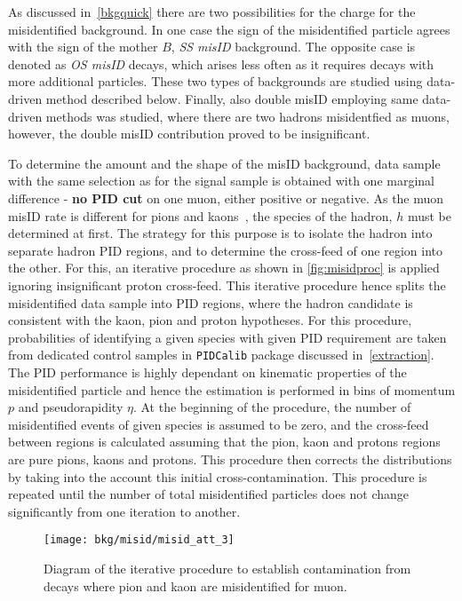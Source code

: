 As discussed in~\autoref{bkgquick} there are two possibilities for the charge for the misidentified background. In one case the sign of the misidentified particle agrees with the sign of the mother $B$, \textit{SS misID} background. The opposite case is denoted as \textit{OS misID} decays, which arises less often as it requires decays with more additional particles. These two types of backgrounds are studied using data-driven method described below. Finally, also double misID employing same data-driven methods was studied, where there are two hadrons misidentfied as muons, however, the double misID contribution proved to be insignificant.


To determine the amount and the shape of the misID background, data sample with the same selection as for the signal sample is obtained with one marginal difference - \textbf{no \gls{PID} cut} on one muon, either positive or negative. As the muon misID rate is different for pions and kaons~\cite{LHCb-DP-2013-001}, the species of the hadron, $h$ must be determined at first. The strategy for this purpose is to isolate the hadron into separate hadron \gls{PID} regions, and to determine the cross-feed of one region into the other. For this, an iterative procedure as shown in \autoref{fig:misidproc} is applied ignoring insignificant proton cross-feed. This iterative procedure hence splits the misidentified data sample into \gls{PID} regions, where the hadron candidate is consistent with the kaon, pion and proton hypotheses. For this procedure, probabilities of identifying a given species with given \gls{PID} requirement are taken from dedicated control samples in \texttt{PIDCalib} package \cite{Anderlini:2202412} discussed in~\autoref{extraction}. The \gls{PID} performance is highly dependant on kinematic properties of the misidentified particle and hence the estimation is performed in bins of momentum $p$ and pseudorapidity $\eta$.
At the beginning of the procedure, the number of misidentified events of given species is assumed to be zero, and the
cross-feed between regions is calculated assuming that the pion, kaon and protons regions are pure pions, kaons and protons.
This procedure then corrects the distributions by taking into the account this initial cross-contamination.
This procedure is repeated until the number of total misidentified particles does not change significantly from one iteration to another.

\begin{figure}[h]
  \begin{center}
    \texttt{[image: bkg/misid/misid\_att\_3]}%
    \vspace*{-0.5cm}
  \end{center}
  \caption{
    Diagram of the iterative procedure to establish contamination from decays where pion and kaon are misidentified for muon.
    }
  \label{fig:misidproc}
\end{figure}



